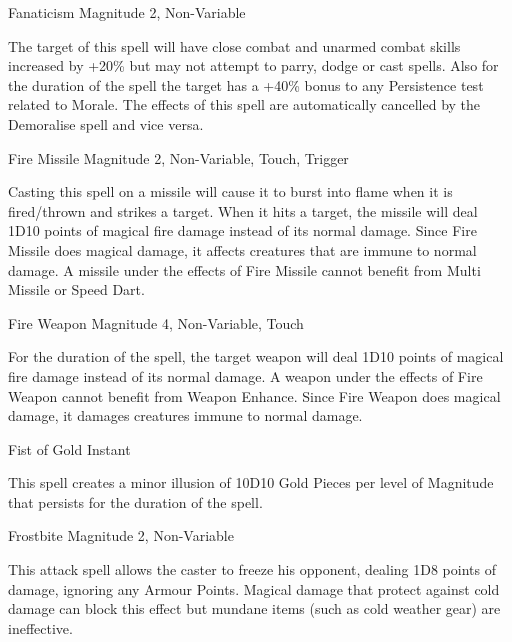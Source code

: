 \begin{rpg-spell}
{Fanaticism}
{Magnitude 2, Non-Variable}

The target of this spell will have close combat and unarmed combat skills increased by +20\% but may not attempt to parry, dodge or cast spells. Also for the duration of the spell the target has a +40\% bonus to any Persistence test related to Morale. The effects of this spell are automatically cancelled by the Demoralise spell and vice versa.
\end{rpg-spell}


\begin{rpg-spell}
{Fire Missile}
{Magnitude 2, Non-Variable, Touch, Trigger}

Casting this spell on a missile will cause it to burst into flame when it is fired/thrown and strikes a target. When it hits a target, the missile will deal 1D10 points of magical fire damage instead of its normal damage. Since Fire Missile does magical damage, it affects creatures that are immune to normal damage. A missile under the effects of Fire Missile cannot benefit from Multi Missile or Speed Dart. 
\end{rpg-spell}


\begin{rpg-spell}
{Fire Weapon}
{Magnitude 4, Non-Variable, Touch}

For the duration of the spell, the target weapon will deal 1D10 points of magical fire damage instead of its normal damage. A weapon under the effects of Fire Weapon cannot benefit from Weapon Enhance. Since Fire Weapon does magical damage, it damages creatures immune to normal damage.
\end{rpg-spell}


\begin{rpg-spell}
{Fist of Gold}
{Instant}

This spell creates a minor illusion of 10D10 Gold Pieces per level of Magnitude that persists for the duration of the spell.
\end{rpg-spell}


\begin{rpg-spell}
{Frostbite}
{Magnitude 2, Non-Variable}

This attack spell allows the caster to freeze his opponent, dealing 1D8 points of damage, ignoring any Armour Points. Magical damage that protect against cold damage can block this effect but mundane items (such as cold weather gear) are ineffective.
\end{rpg-spell}


